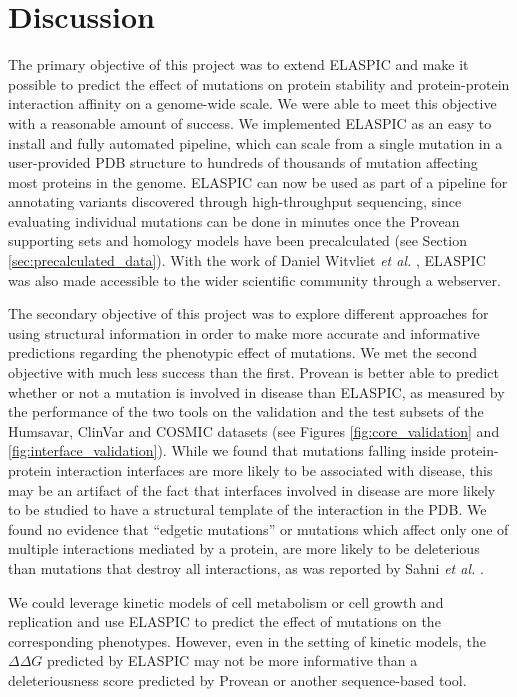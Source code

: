 
\chapter{Discussion} \label{ch:discussion}

The primary objective of this project was to extend ELASPIC and make it possible to predict the effect of mutations on protein stability and protein-protein interaction affinity on a genome-wide scale. We were able to meet this objective with a reasonable amount of success. We implemented ELASPIC as an easy to install and fully automated pipeline, which can scale from a single mutation in a user-provided PDB structure to hundreds of thousands of mutation affecting most proteins in the genome. ELASPIC can now be used as part of a pipeline for annotating variants discovered through high-throughput sequencing, since evaluating individual mutations can be done in minutes once the Provean supporting sets and homology models have been precalculated (see Section \ref{sec:precalculated_data}). With the work of Daniel Witvliet \textit{et al.} \cite{witvliet_elaspic_2016}, ELASPIC was also made accessible to the wider scientific community through a webserver.

The secondary objective of this project was to explore different approaches for using structural information in order to make more accurate and informative predictions regarding the phenotypic effect of mutations. We met the second objective with much less success than the first. Provean is better able to predict whether or not a mutation is involved in disease than ELASPIC, as measured by the performance of the two tools on the validation and the test subsets of the Humsavar, ClinVar and COSMIC datasets (see Figures \ref{fig:core_validation} and \ref{fig:interface_validation}). While we found that mutations falling inside protein-protein interaction interfaces are more likely to be associated with disease, this may be an artifact of the fact that interfaces involved in disease are more likely to be studied to have a structural template of the interaction in the PDB. We found no evidence that ``edgetic mutations'' or mutations which affect only one of multiple interactions mediated by a protein, are more likely to be deleterious than mutations that destroy all interactions, as was reported by Sahni \textit{et al.} \cite{sahni_widespread_2015}.

We could leverage kinetic models of cell metabolism \cite{bordbar_personalized_2015} or cell growth and replication \cite{karr_whole-cell_2012} and use ELASPIC to predict the effect of mutations on the corresponding phenotypes. However, even in the setting of kinetic models, the $\Delta \Delta G$ predicted by ELASPIC may not be more informative than a deleteriousness score predicted by Provean or another sequence-based tool.

